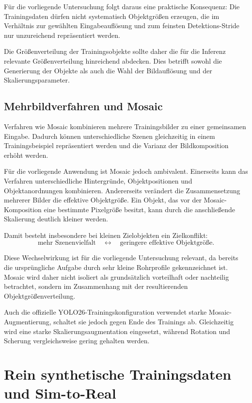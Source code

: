 Für die vorliegende Untersuchung folgt daraus eine praktische Konsequenz: Die Trainingsdaten dürfen nicht systematisch Objektgrößen erzeugen, die im Verhältnis zur gewählten Eingabeauflösung und zum feinsten Detektions-Stride nur unzureichend repräsentiert werden.

Die Größenverteilung der Trainingsobjekte sollte daher die für die Inferenz relevante Größenverteilung hinreichend abdecken. Dies betrifft sowohl die Generierung der Objekte als auch die Wahl der Bildauflösung und der Skalierungsparameter.

\subsection{Mehrbildverfahren und Mosaic}

Verfahren wie Mosaic kombinieren mehrere Trainingsbilder zu einer gemeinsamen Eingabe. Dadurch können unterschiedliche Szenen gleichzeitig in einem Trainingsbeispiel repräsentiert werden und die Varianz der Bildkomposition erhöht werden.

Für die vorliegende Anwendung ist Mosaic jedoch ambivalent. Einerseits kann das Verfahren unterschiedliche Hintergründe, Objektpositionen und Objektanordnungen kombinieren. Andererseits verändert die Zusammensetzung mehrerer Bilder die effektive Objektgröße. Ein Objekt, das vor der Mosaic-Komposition eine bestimmte Pixelgröße besitzt, kann durch die anschließende Skalierung deutlich kleiner werden.

Damit besteht insbesondere bei kleinen Zielobjekten ein Zielkonflikt:
\begin{equation}
\text{mehr Szenenvielfalt}
\quad\leftrightarrow\quad
\text{geringere effektive Objektgröße}.
\end{equation}

Diese Wechselwirkung ist für die vorliegende Untersuchung relevant, da bereits die ursprüngliche Aufgabe durch sehr kleine Rohrprofile gekennzeichnet ist. Mosaic wird daher nicht isoliert als grundsätzlich vorteilhaft oder nachteilig betrachtet, sondern im Zusammenhang mit der resultierenden Objektgrößenverteilung.

Auch die offizielle YOLO26-Trainingskonfiguration verwendet starke Mosaic-Augmentierung, schaltet sie jedoch gegen Ende des Trainings ab. Gleichzeitig wird eine starke Skalierungsaugmentation eingesetzt, während Rotation und Scherung vergleichsweise gering gehalten werden.

\section{Rein synthetische Trainingsdaten und Sim-to-Real}

